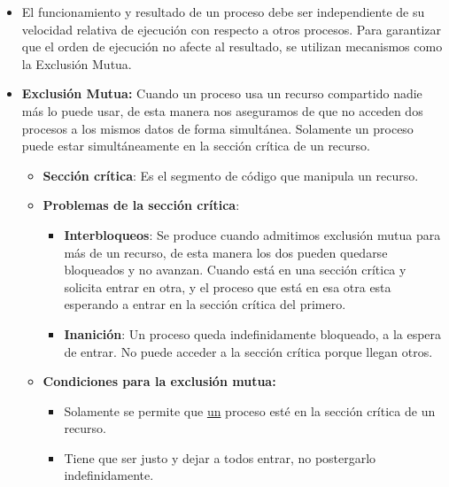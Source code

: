 \documentclass[12pt, twoside, openright]{report} %
\begin{document}
  \begin{itemize}
  \item El funcionamiento y resultado de un proceso debe ser independiente
    de su velocidad relativa de ejecución con respecto a otros procesos.
    Para garantizar que el orden de ejecución no afecte al resultado, se
    utilizan mecanismos como la Exclusión Mutua.
    
  \item \textbf{Exclusión Mutua:} Cuando un proceso usa un recurso
    compartido nadie más lo puede usar, de esta manera nos aseguramos de
    que no acceden dos procesos a los mismos datos de forma simultánea.
    Solamente un proceso puede estar simultáneamente en la sección
    crítica de un recurso.
    

    \begin{itemize}
    \item \textbf{Sección crítica}: Es el segmento de código que manipula un
      recurso.
      
    \item \textbf{Problemas de la sección crítica}:
      

      \begin{itemize}
      \item \textbf{Interbloqueos}: Se produce cuando admitimos exclusión
        mutua para más de un recurso, de esta manera los dos pueden
        quedarse bloqueados y no avanzan. Cuando está en una sección
        crítica y solicita entrar en otra, y el proceso que está en esa
        otra esta esperando a entrar en la sección crítica del primero.
        
      \item \textbf{Inanición}: Un proceso queda indefinidamente bloqueado,
        a la espera de entrar. No puede acceder a la sección crítica
        porque llegan otros.
        
      \end{itemize}
    \item \textbf{Condiciones para la exclusión mutua:}
      

      \begin{itemize}
      \item Solamente se permite que \underline{un} proceso esté en la
        sección crítica de un recurso.
        
      \item Tiene que ser justo y dejar a todos entrar, no postergarlo
        indefinidamente.
        

\end{itemize}
\end{itemize}
\end{itemize}
\end{document}
